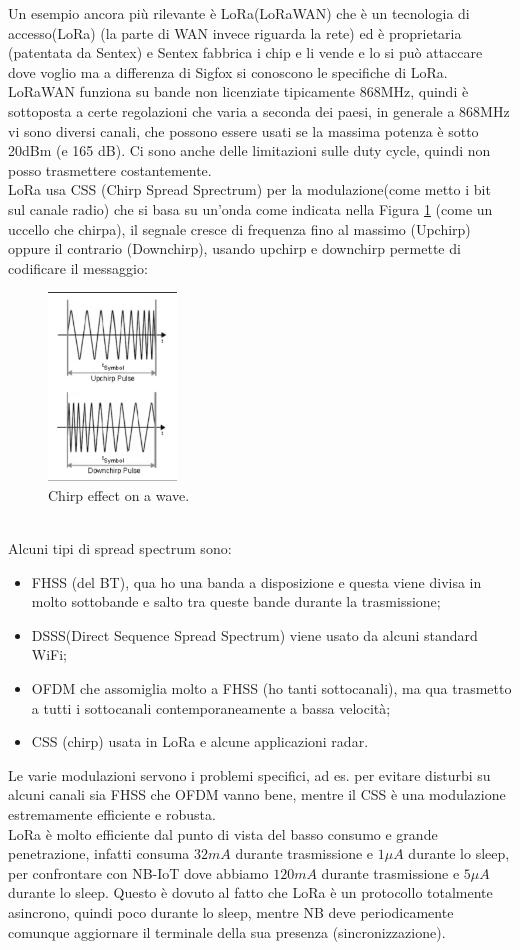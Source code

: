 \documentclass[11pt, twocolumn]{article}
\newenvironment{myitemize}
{ \begin{itemize}[topsep=0ex]
		\setlength{\itemsep}{0pt}
		\setlength{\parskip}{0pt}
		\setlength{\parsep}{0pt}     }
	{ \end{itemize}                  }
\begin{document}
Un esempio ancora più rilevante è LoRa(LoRaWAN) che è un tecnologia di accesso(LoRa) (la parte di WAN invece riguarda la rete) ed è proprietaria (patentata da Sentex) e Sentex fabbrica i chip e li vende e lo si può attaccare dove voglio ma a differenza di Sigfox si conoscono le specifiche di LoRa.\\
LoRaWAN funziona su bande non licenziate tipicamente 868MHz, quindi è sottoposta a certe regolazioni che varia a seconda dei paesi, in generale a 868MHz vi sono diversi canali, che possono essere usati se la massima potenza è sotto 20dBm (e 165 dB).
Ci sono anche delle limitazioni sulle duty cycle, quindi  non posso trasmettere costantemente.\\
LoRa usa CSS (Chirp Spread Sprectrum) per la modulazione(come metto i bit sul canale radio) che si basa su un'onda come indicata nella Figura \ref{fig:chirp} (come un uccello che chirpa), il segnale cresce di frequenza fino al massimo (Upchirp) oppure il contrario (Downchirp), usando upchirp e downchirp permette di codificare il messaggio:
\begin{figure}[!h]
  \centering
  \includegraphics[width=\linewidth,height=5cm]{imgs/chirp.png}
  \caption{Chirp effect on a wave.}
  \label{fig:chirp}
\end{figure}\\
Alcuni tipi di spread spectrum sono:
\begin{myitemize}
\item FHSS (del BT), qua ho una banda a disposizione e questa viene divisa in molto sottobande e salto tra queste bande durante la trasmissione;
\item DSSS(Direct Sequence Spread Spectrum) viene usato da alcuni standard WiFi;
\item OFDM che assomiglia molto a FHSS (ho tanti sottocanali), ma qua trasmetto a tutti i sottocanali contemporaneamente a bassa velocità;
\item CSS (chirp) usata in LoRa e alcune applicazioni radar.
\end{myitemize}
Le varie modulazioni servono i problemi specifici, ad es. per evitare disturbi su alcuni canali sia FHSS che OFDM vanno bene, mentre il CSS è una modulazione estremamente efficiente e robusta.\\
LoRa è molto efficiente dal punto di vista del basso consumo e grande penetrazione, infatti consuma $32mA$ durante trasmissione e $1\mu A$ durante lo sleep, per confrontare con NB-IoT dove abbiamo $120mA$ durante trasmissione e $5\mu A$ durante lo sleep.
Questo è dovuto al fatto che LoRa è un protocollo totalmente asincrono, quindi poco durante lo sleep, mentre NB deve periodicamente comunque aggiornare il terminale della sua presenza (sincronizzazione).
\end{document}

